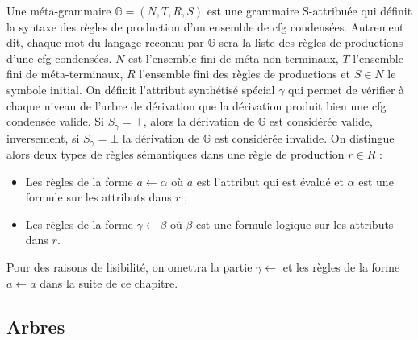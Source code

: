 \begin{definition}
    Une méta-grammaire $\mathbb{G} = (N, T, R, S)$ est une grammaire S-attribuée qui définit la syntaxe des règles de production d'un ensemble de \gls{cfg} condensées.
    Autrement dit, chaque mot du langage reconnu par $\mathbb{G}$ sera la liste des règles de productions d'une \gls{cfg} condensées.
    $N$ est l'ensemble fini de méta-non-terminaux, $T$ l'ensemble fini de méta-terminaux, $R$ l'ensemble fini des règles de productions et $S \in N$ le symbole initial.
    On définit l'attribut synthétisé spécial $\gamma$ qui permet de vérifier à chaque niveau de l'arbre de dérivation que la dérivation produit bien une \gls{cfg} condensée valide.
    Si $S_\gamma = \top$, alors la dérivation de $\mathbb{G}$ est considérée valide, inversement, si $S_\gamma = \bot$ la dérivation de $\mathbb{G}$ est considérée invalide.
    On distingue alors deux types de règles sémantiques dans une règle de production $r \in R$ :
    \begin{itemize}
        \item Les règles de la forme $a \gets \alpha$ où $a$ est l'attribut qui est évalué et $\alpha$ est une formule sur les attributs dans $r$ ;
        \item Les règles de la forme $\gamma \gets \beta$ où $\beta$ est une formule logique sur les attributs dans $r$.
    \end{itemize}
    Pour des raisons de lisibilité, on omettra la partie $\gamma \gets$ et les règles de la forme $a \gets a$ dans la suite de ce chapitre.
\end{definition}

\subsection{Arbres}

